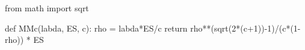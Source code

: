 
from math import sqrt

def MMc(labda, ES, c):
    rho = labda*ES/c
    return  rho**(sqrt(2*(c+1))-1)/(c*(1-rho)) * ES


